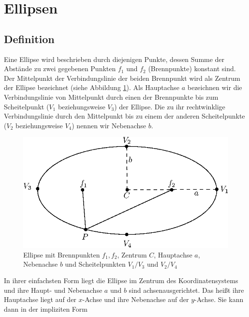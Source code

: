 \section{Ellipsen}
\label{s:ellipse}
\subsection{Definition}
\label{s:ellipseGeneral}

\begin{definition}[Ellipse]
	Eine Ellipse wird beschrieben durch diejenigen Punkte, dessen Summe der Abstände zu zwei gegebenen Punkten $f_1$ und $f_2$ (Brennpunkte) konstant sind. Der Mittelpunkt der Verbindungslinie der beiden Brennpunkt wird als Zentrum der Ellipse bezeichnet (siehe Abbildung \ref{fig:ellipseDef}).
	Als Hauptachse $a$ bezeichnen wir die Verbindungslinie von Mittelpunkt durch einen der Brennpunkte bis zum Scheitelpunkt ($V_1$ beziehungsweise $V_3$) der Ellipse. Die zu ihr rechtwinklige Verbindungslinie durch den Mittelpunkt bis zu einem der anderen Scheitelpunkte ($V_2$ beziehungsweise $V_4$) nennen wir Nebenachse $b$.
\end{definition}

\begin{figure}[!htb]
	\centering
	\includegraphics[scale=.9]{images/ellipse_focalDef.eps}
	\caption{Ellipse mit Brennpunkten $f_1, f_2$, Zentrum $C$, Hauptachse $a$, Nebenachse $b$ und Scheitelpunkten $V_1/V_3$ und $V_2/V_4$}
	\label{fig:ellipseDef}
\end{figure}

In ihrer einfachsten Form liegt die Ellipse im Zentrum des Koordinatensystems und ihre Haupt- und Nebenachse $a$ und $b$ sind achsenausgerichtet. Das heißt ihre Hauptachse liegt auf der $x$-Achse und ihre Nebenachse auf der $y$-Achse. Sie kann dann in der impliziten Form

